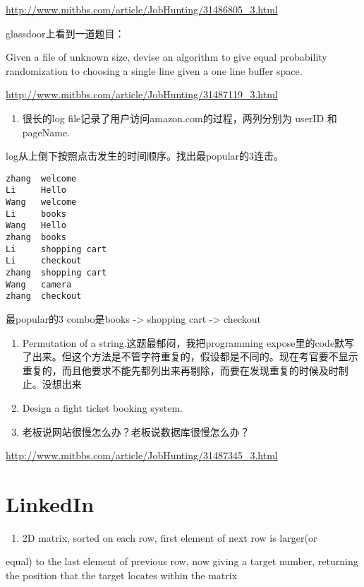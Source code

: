\documentclass[12pt]{book}
\begin{document}
\url{http://www.mitbbs.com/article/JobHunting/31486805_3.html}

glassdoor上看到一道题目：

Given a file of unknown size, devise an algorithm to give equal probability randomization to choosing a single line given a one line buffer space.

\url{http://www.mitbbs.com/article/JobHunting/31487119_3.html}

\begin{enumerate}
\item 很长的log file记录了用户访问amazon.com的过程，两列分别为 userID 和 pageName.
\end{enumerate}

log从上倒下按照点击发生的时间顺序。找出最popular的3连击。
\lstset{language=java,label= ,caption= ,numbers=none}
\begin{lstlisting}
zhang  welcome
Li     Hello
Wang   welcome
Li     books
Wang   Hello
zhang  books
Li     shopping cart
Li     checkout
zhang  shopping cart
Wang   camera
zhang  checkout
\end{lstlisting}

最popular的3 combo是books -> shopping cart -> checkout

\begin{enumerate}
\item Permutation of a string.这题最郁闷，我把programming expose里的code默写了出来。但这个方法是不管字符重复的，假设都是不同的。现在考官要不显示重复的，而且他要求不能先都列出来再剔除，而要在发现重复的时候及时制止。没想出来

\item Design a fight ticket booking system.

\item 老板说网站很慢怎么办？老板说数据库很慢怎么办？
\end{enumerate}

\url{http://www.mitbbs.com/article/JobHunting/31487345_3.html}

\chapter{LinkedIn}
\label{sec-16}
\begin{enumerate}
\item 2D matrix, sorted on each row, first element of next row is larger(or
\end{enumerate}
equal) to the last element of previous row, now giving a target number, 
returning the position that the target locates within the matrix
\end{document}
